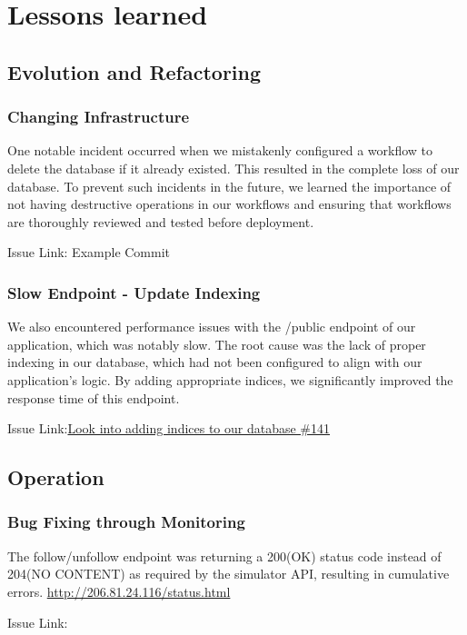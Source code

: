\section{Lessons learned}
\subsection{Evolution and Refactoring}

\subsubsection{Changing Infrastructure}
One notable incident occurred when we mistakenly configured a workflow to delete the database if it already existed. This resulted in the complete loss of our database. To prevent such incidents in the future, we learned the importance of not having destructive operations in our workflows and ensuring that workflows are thoroughly reviewed and tested before deployment.

Issue Link: Example Commit

\subsubsection{Slow Endpoint - Update Indexing}
We also encountered performance issues with the /public endpoint of our application, which was notably slow. The root cause was the lack of proper indexing in our database, which had not been configured to align with our application's logic. By adding appropriate indices, we significantly improved the response time of this endpoint.

Issue Link:\href{https://github.com/DevopsGroupC/Minitwit/issues/141}{\color{blue}Look into adding indices to our database \#141}

\subsection{Operation}

\subsubsection{Bug Fixing through Monitoring}
The follow/unfollow endpoint was returning a 200(OK) status code instead of 204(NO CONTENT) as required by the simulator API, resulting in cumulative errors.
\href{http://206.81.24.116/status.html}{http://206.81.24.116/status.html}

Issue Link:


